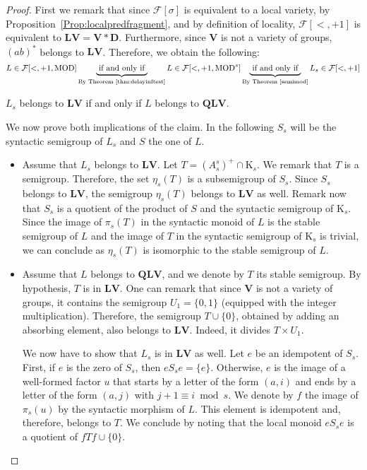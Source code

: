 \documentclass[submission,hidelink]{dmtcs-episciences}
\newcommand{\WFp}[1]{\textrm{K}_{#1}}
\newcommand{\D}{\mathbf{D}}
\newcommand{\QLV}{\mathbf{QLV}}
\newcommand{\LV}{\mathbf{LV}}
\newcommand{\V}{\mathbf{V}}
\newcommand{\cF}{\mathcal{F}}
\newcommand{\MOD}{\mathrm{MOD}}
\begin{document}
\begin{proof}
First we remark that since $\cF[\sigma]$ is equivalent to a local variety, by
Proposition~\ref{Prop:localpredfragment}, and by definition of locality,
 $\cF[<,+1]$ is equivalent to $\LV=\V*\D$. Furthermore, since $\V$ is not a variety of groups,
 $(ab)^*$ belongs to $\LV$. Therefore, we obtain the following:
 $$L\in\cF[<,+1,\MOD]\underbrace{\text{ if and only if }}_{\text{By Theorem~\ref{thm:delayinftest}}}
 L \in \cF[<,+1,\MOD^s]\underbrace{\text{ if and only if }}_{\text{By Theorem~\ref{semimod}}} L_s \in \cF[<,+1]$$

	 $L_s$ belongs to $\LV$ if and only if
	$L$ belongs to $\QLV$.

	We now prove both implications of the claim. In the following $S_s$ will be the syntactic semigroup
	of $L_s$ and $S$ the one of $L$.
	\begin{itemize}
	\item Assume that $L_s$ belongs to $\LV$.
	 Let $T= (A_s^s)^+\cap \WFp{s}$. We remark that $T$
	is a semigroup. Therefore, the set $\eta_s(T)$ is a subsemigroup of $S_s$. Since $S_s$ belongs to $\LV$,
	the semigroup $\eta_s(T)$ belongs to $\LV$ as well.
	 Remark now that $S_s$ is a quotient of the product of $S$ and the syntactic semigroup of
	$\WFp{s}$. Since the image of $\pi_s(T)$ in the syntactic monoid of $L$ is the stable semigroup of $L$ and
	 the image of $T$ in the syntactic
	semigroup of $\WFp{s}$ is trivial, we can conclude as $\eta_s(T)$ is isomorphic to the
	stable semigroup of $L$.

		\item Assume that $L$ belongs to $\QLV$, and we denote by $T$ its stable semigroup.
		By hypothesis,
		 $T$ is in $\LV$. One can remark that since $\V$ is not a variety of groups, it contains the semigroup
		 $U_1=\{0,1\}$ (equipped with the integer multiplication).
		 Therefore, the semigroup $T\cup\{0\}$, obtained by adding an
		absorbing element, also belongs to $\LV$. Indeed, it divides $T\times U_1$.

		 We now have to show that $L_s$ is in $\LV$ as well.
		Let $e$ be an idempotent of $S_s$. First, if $e$ is the zero of $S_s$, then
		$eS_se=\{e\}$. Otherwise, $e$ is the image of a well-formed factor $u$ that starts by a letter of
		the form $(a,i)$ and ends by a letter of the form $(a,j)$ with $j+1\equiv i\bmod{s}$.
		We denote by		$f$ the image of $\pi_s(u)$ by the syntactic morphism of $L$. This element
		is idempotent and, therefore, belongs to $T$.
		We conclude by noting that
		the local monoid  $eS_se$ is a quotient of $fTf\cup\{0\}$.
	\end{itemize}
\end{proof}
\end{document}
